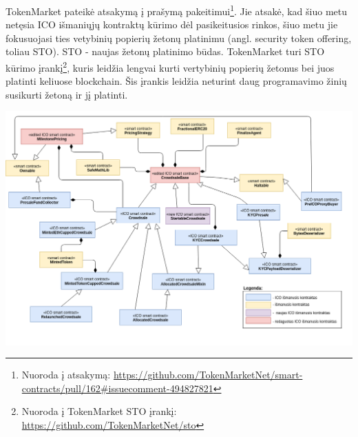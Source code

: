 \documentclass{VUMIFPSbakalaurinis}
\begin{document}
TokenMarket pateikė atsakymą į prašymą pakeitimui\footnote{Nuoroda į atsakymą: \url{https://github.com/TokenMarketNet/smart-contracts/pull/162#issuecomment-494827821}}. Jie atsakė, kad šiuo metu netęsia ICO išmaniųjų kontraktų kūrimo dėl pasikeitusios rinkos, šiuo metu jie fokusuojasi ties vetybinių popierių žetonų platinimu (angl. security token offering, toliau STO). STO - naujas žetonų platinimo būdas. TokenMarket turi STO kūrimo įrankį\footnote{Nuoroda į TokenMarket STO įrankį: \url{https://github.com/TokenMarketNet/sto}}, kuris leidžia lengvai kurti vertybinių popierių žetonus bei juos platinti keliuose blockchain. Šis įrankis leidžia neturint daug programavimo žinių susikurti žetoną ir jį platinti.



\pagebreak

\begin{landscape}

\begin{center}
    \includegraphics[scale=0.59]{img/tm_moduliai}
    \label{img:tm_module}
\end{center}

\end{landscape}

\pagebreak
\end{document}
